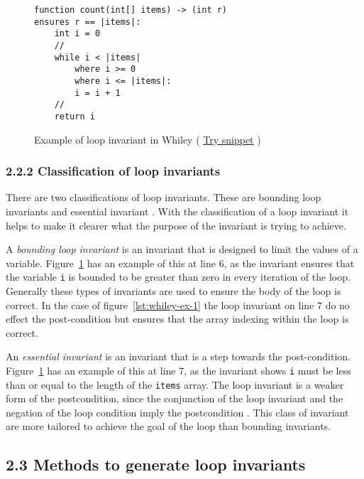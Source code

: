 \documentclass[11pt, a4paper, twoside, openright]{report}
\newcommand{\code}[1]{\texttt{#1}}
\begin{document}
\begin{figure}[ht]
\begin{lstlisting}
function count(int[] items) -> (int r)
ensures r == |items|:
    int i = 0
    //
    while i < |items|
        where i >= 0
        where i <= |items|:
        i = i + 1
    //
    return i
\end{lstlisting}
    \caption{Example of loop invariant in Whiley (
    \href{http://whiley.org/play/?id=DzLm1T}{Try snippet} ) }
    \label{lst:whiley-inv}
\end{figure}

\subsubsection*{2.2.2 Classification of loop invariants}

There are two classifications of loop invariants.
These are bounding loop invariants and essential invariant
\cite{invarints-classifiction}.
With the classification of a loop invariant it helps to make
it clearer what the purpose of the invariant is trying to achieve.

A \textit{bounding loop invariant} is an invariant that is designed
to limit the values of a variable.
Figure~\ref{lst:whiley-inv} has an example of this at line 6, as the invariant
ensures that the variable \code{i} is bounded to be greater than zero
in every iteration of the loop.
Generally these types of invariants are used to ensure the body of the loop
is correct. In the case of figure~\ref{lst:whiley-ex-1} the loop invariant on line
7 do no effect the post-condition but ensures that the array indexing within
the loop is correct.

An \textit{essential invariant} is an invariant that is a step towards the
post-condition.
Figure~\ref{lst:whiley-inv} has an example of this at line 7,
as the invariant shows \code{i} must be less than or
equal to the length of the \code{items} array.
The loop invariant is a weaker form of the postcondition,
since the conjunction of the loop invariant and the negation
of the loop condition imply the postcondition \cite{invarints-classifiction}.
This class of invariant are more tailored to achieve
the goal of the loop than bounding invariants.


\subsection*{2.3 Methods to generate loop invariants}
\end{document}
